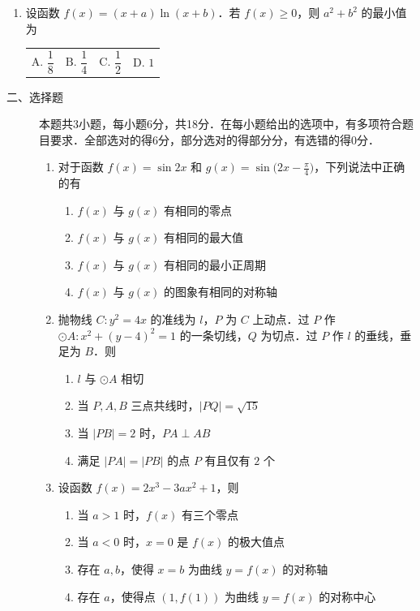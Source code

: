 \begin{description}
\begin{enumerate}[leftmargin=5pt]
        \item 设函数 $f(x)=(x+a)\ln(x+b)$．若 $f(x)\geqslant0$，则 $a^2+b^2$ 的最小值为
       
        {\centering\begin{tabular*}{\linewidth}{@{}@{\extracolsep{\fill}}llll@{}}
          \(\text{A. }\dfrac{1}{8}\)  & \(\text{B. }\dfrac{1}{4}\)  & \(\text{C. }\dfrac{1}{2}\)  & \(\text{D. }1\)
        \end{tabular*}\par}
    \end{enumerate}
\end{description}

\begin{description}
    \item[二、选择题] 本题共3小题，每小题6分，共18分．在每小题给出的选项中，有多项符合题目要求．全部选对的得6分，部分选对的得部分分，有选错的得0分．
    \begin{enumerate}[leftmargin=5pt]
      \addtocounter{enumi}{+8}
        \item 对于函数 $f(x)=\sin2x$ 和 $g(x)=\sin\bigl(2x-\frac{\pi}{4}\bigr)$，下列说法中正确的有
        \begin{enumerate}[label=\Alph*.]
            \item $f(x)$ 与 $g(x)$ 有相同的零点
            \item $f(x)$ 与 $g(x)$ 有相同的最大值
            \item $f(x)$ 与 $g(x)$ 有相同的最小正周期
            \item $f(x)$ 与 $g(x)$ 的图象有相同的对称轴
        \end{enumerate}

        \item 抛物线 $C:y^2=4x$ 的准线为 $l$，$P$ 为 $C$ 上动点．过 $P$ 作 $\odot A:x^2+(y-4)^2=1$ 的一条切线，$Q$ 为切点．过 $P$ 作 $l$ 的垂线，垂足为 $B$．则
        \begin{enumerate}[label=\Alph*.]
            \item $l$ 与 $\odot A$ 相切
            \item 当 $P,A,B$ 三点共线时，$|PQ|=\sqrt{15}$
            \item 当 $|PB|=2$ 时，$PA\perp AB$
            \item 满足 $|PA|=|PB|$ 的点 $P$ 有且仅有 $2$ 个
        \end{enumerate}

        \item 设函数 $f(x)=2x^3-3ax^2+1$，则
        \begin{enumerate}[label=\Alph*.]
            \item 当 $a>1$ 时，$f(x)$ 有三个零点
            \item 当 $a<0$ 时，$x=0$ 是 $f(x)$ 的极大值点
            \item 存在 $a,b$，使得 $x=b$ 为曲线 $y=f(x)$ 的对称轴
            \item 存在 $a$，使得点 $(1,f(1))$ 为曲线 $y=f(x)$ 的对称中心
        \end{enumerate}
    \end{enumerate}
\end{description}


